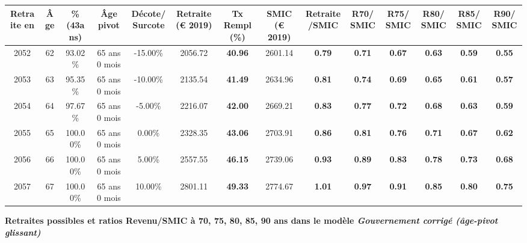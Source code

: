 \begin{adjustbox}{max width=\textwidth} 
\begin{tabular}[htb]{|c|c||c|c|c||c|c||c|c||c|c|c|c|c|} 
\hline 
 Retraite en &  Âge &  \%(43ans) &  Âge pivot &  Décote/Surcote &  Retraite (\euro{} 2019) &  Tx Rempl(\%) &  SMIC (\euro{} 2019) &  Retraite/SMIC &  R70/SMIC &  R75/SMIC &  R80/SMIC &  R85/SMIC &  R90/SMIC \\ 
\hline \hline 
 2052 &  62 &  93.02\% &  65 ans 0 mois &  -15.00\% &  2056.72 &  {\bf 40.96} &  2601.14 &  {\bf {\color{red} 0.79}} &  {\bf {\color{red} 0.71}} &  {\bf {\color{red} 0.67}} &  {\bf {\color{red} 0.63}} &  {\bf {\color{red} 0.59}} &  {\bf {\color{red} 0.55}} \\ 
\hline 
 2053 &  63 &  95.35\% &  65 ans 0 mois &  -10.00\% &  2135.54 &  {\bf 41.49} &  2634.96 &  {\bf {\color{red} 0.81}} &  {\bf {\color{red} 0.74}} &  {\bf {\color{red} 0.69}} &  {\bf {\color{red} 0.65}} &  {\bf {\color{red} 0.61}} &  {\bf {\color{red} 0.57}} \\ 
\hline 
 2054 &  64 &  97.67\% &  65 ans 0 mois &  -5.00\% &  2216.07 &  {\bf 42.00} &  2669.21 &  {\bf {\color{red} 0.83}} &  {\bf {\color{red} 0.77}} &  {\bf {\color{red} 0.72}} &  {\bf {\color{red} 0.68}} &  {\bf {\color{red} 0.63}} &  {\bf {\color{red} 0.59}} \\ 
\hline 
 2055 &  65 &  100.00\% &  65 ans 0 mois &  0.00\% &  2328.35 &  {\bf 43.06} &  2703.91 &  {\bf {\color{red} 0.86}} &  {\bf {\color{red} 0.81}} &  {\bf {\color{red} 0.76}} &  {\bf {\color{red} 0.71}} &  {\bf {\color{red} 0.67}} &  {\bf {\color{red} 0.62}} \\ 
\hline 
 2056 &  66 &  100.00\% &  65 ans 0 mois &  5.00\% &  2557.55 &  {\bf 46.15} &  2739.06 &  {\bf {\color{red} 0.93}} &  {\bf {\color{red} 0.89}} &  {\bf {\color{red} 0.83}} &  {\bf {\color{red} 0.78}} &  {\bf {\color{red} 0.73}} &  {\bf {\color{red} 0.68}} \\ 
\hline 
 2057 &  67 &  100.00\% &  65 ans 0 mois &  10.00\% &  2801.11 &  {\bf 49.33} &  2774.67 &  {\bf 1.01} &  {\bf {\color{red} 0.97}} &  {\bf {\color{red} 0.91}} &  {\bf {\color{red} 0.85}} &  {\bf {\color{red} 0.80}} &  {\bf {\color{red} 0.75}} \\ 
\hline 
\hline 
\end{tabular} 
\end{adjustbox} 
 
 \vspace{0.1cm} 
{\bf \noindent Retraites possibles et ratios Revenu/SMIC à 70, 75, 80, 85, 90 ans dans le modèle \emph{Gouvernement corrigé (âge-pivot glissant)}}  
 
